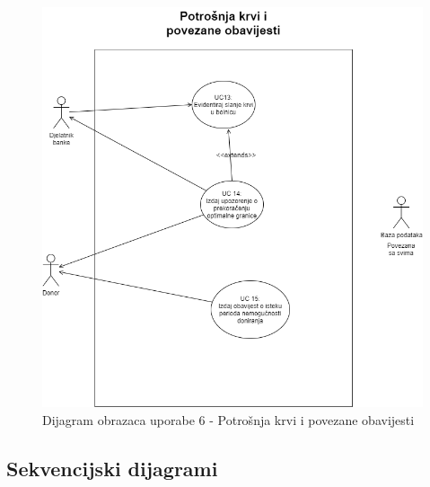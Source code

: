 				\begin{figure}[H]
    			\includegraphics[scale=0.6]{slike/UC6.png} %
    			\centering
    			\caption{Dijagram obrazaca uporabe 6 - Potrošnja krvi i povezane obavijesti}
    			\label{fig:promjene}
    	    	\end{figure}
    	    	
				\eject		
				
			\subsection{Sekvencijski dijagrami}
				
				
				
